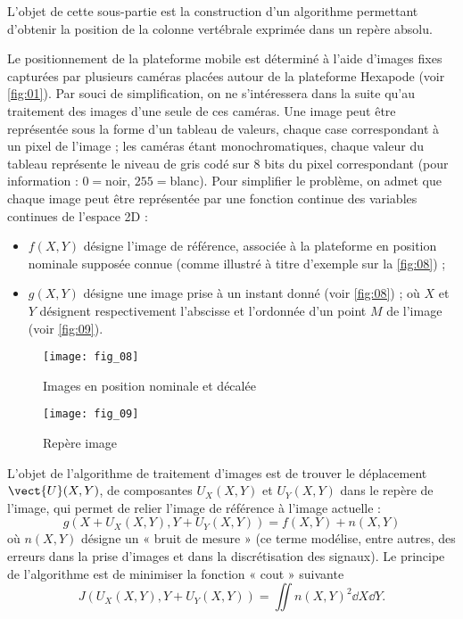 \begin{obj}
L’objet de cette sous-partie est la construction d’un algorithme permettant d’obtenir la position de la
colonne vertébrale exprimée dans un repère absolu.
\end{obj}

Le positionnement de la plateforme mobile est déterminé à l’aide d’images fixes capturées par plusieurs caméras
placées autour de la plateforme Hexapode (voir \autoref{fig:01}). Par souci de simplification, on ne s’intéressera dans
la suite qu’au traitement des images d’une seule de ces caméras.
Une image peut être représentée sous la forme d’un tableau de valeurs, chaque case correspondant à un pixel de
l’image ; les caméras étant monochromatiques, chaque valeur du tableau représente le niveau de gris codé sur 8
bits du pixel correspondant (pour information : $0=$noir, $255=$blanc). Pour simplifier le problème, on admet que
chaque image peut être représentée par une fonction continue des variables continues de l’espace 2D :
\begin{itemize}
\item $f(X,Y)$ désigne l’image de référence, associée à la plateforme en position nominale supposée connue (comme
illustré à titre d’exemple sur la \autoref{fig:08}) ;
\item $g(X,Y)$ désigne une image prise à un instant donné (voir \autoref{fig:08}) ;
où $X$ et $Y$ désignent respectivement l’abscisse et l’ordonnée d’un point $M$ de l’image (voir \autoref{fig:09}).
\end{itemize}


\begin{figure}[H]
\centering
\texttt{[image: fig\_08]}
\caption{\label{fig:08}  Images en position nominale et décalée}
\end{figure}


\begin{figure}[H]
\centering
\texttt{[image: fig\_09]}
\caption{\label{fig:09}  Repère image}
\end{figure}

L’objet de l’algorithme de traitement d’images est de trouver le déplacement $\vect{U}(X,Y)$, de composantes $U_X(X,Y)$ et 
$U_Y(X,Y)$ dans le repère de l’image, qui permet de relier l’image de référence à l’image actuelle :
$$g\left( X + U_X(X,Y),Y + U_Y(X,Y)\right) = f(X,Y)+n(X,Y)$$
où $n(X,Y)$ désigne un « bruit de mesure » (ce terme modélise, entre autres, des erreurs dans la prise d’images et
dans la discrétisation des signaux). Le principe de l’algorithme est de minimiser la fonction « cout » suivante 
$$J\left( U_X(X,Y),Y + U_Y(X,Y)\right) = \iint n(X,Y)^2 \dd X \dd Y.$$


